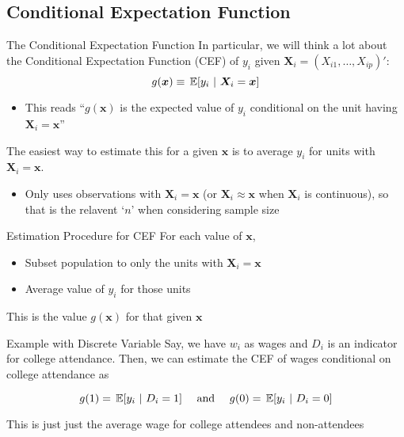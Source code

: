 \documentclass[aspectratio=169,t,11pt,table]{beamer}
\begin{document}
\subsection{Conditional Expectation Function}

\begin{frame}{The Conditional Expectation Function}
  In particular, we will think a lot about the \alert{Conditional Expectation Function} (CEF) of $y_i$ given $\bm{X}_i = (X_{i1}, \dots, X_{ip})'$:
  $$
    g(\bm{x}) \equiv \expec{y_i}{\bm{X}_i = \bm{x}}
  $$
  \begin{itemize}
    \item This reads ``$g(\bm{x})$ is the expected value of $y_i$ conditional on the unit having $\bm{X}_i = \bm{x}$''
  \end{itemize}

  \pause
  \bigskip
  The easiest way to estimate this for a given $\bm{x}$ is to average $y_i$ for units with $\bm{X}_i = \bm{x}$. 
  \pause
  \begin{itemize}
    \item Only uses observations with $\bm{X}_i = \bm{x}$ (or $\bm{X}_i \approx \bm{x}$ when $\bm{X}_i$ is continuous), so that is the relavent `$n$' when considering sample size
  \end{itemize}
\end{frame}

\begin{frame}{Estimation Procedure for CEF}
  For each value of $\bm{x}$, 
  \begin{itemize}
    \item Subset population to only the units with $\bm{X}_i = \bm{x}$
    
    \item Average value of $y_i$ for those units
  \end{itemize}
  
  This is the value $g(\bm{x})$ for that given $\bm{x}$
\end{frame}

\begin{frame}{Example with Discrete Variable}
  Say, we have $w_i$ as wages and $D_i$ is an indicator for college attendance. Then, we can estimate the CEF of wages conditional on college attendance as

  $$
    g(1) = \expec{y_i}{D_i = 1} \quad\text{ and }\quad g(0) = \expec{y_i}{D_i = 0}
  $$

  \bigskip
  This is just just the average wage for college attendees and non-attendees
\end{frame}
\end{document}
